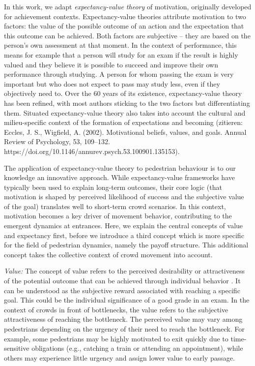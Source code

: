 \documentclass[pdflatex,sn-mathphys-num]{sn-jnl}%
\theoremstyle{thmstyleone}%
\theoremstyle{thmstyletwo}%
\theoremstyle{thmstylethree}%
\begin{document}
In this work, we adapt \textit{expectancy-value theory} \cite{atkinson_introduction_1964, vroom_work_1964, wigfield_expectancy-value_2000, eccles_expectancy_2020} of motivation, originally developed for achievement contexts. Expectancy-value theories attribute motivation to two factors: the value of the possible outcome of an action and the expectation that this outcome can be achieved. Both factors are subjective – they are based on the person's own assessment at that moment. In the context of performance, this means for example that a person will study for an exam if the result is highly valued and they believe it is possible to succeed and improve their own performance through studying. A person for whom passing the exam is very important but who does not expect to pass may study less, even if they objectively need to. Over the 60 years of its existence, expectancy-value theory has been refined, with most authors sticking to the two factors but differentiating them. Situated expectancy-value theory also takes into account the cultural and milieu-specific context of the formation of expectations and becoming (zitieren: Eccles, J. S., Wigfield, A. (2002). Motivational beliefs, values, and goals. Annual Review of Psychology, 53, 109–132. https://doi.org/10.1146/annurev.psych.53.100901.135153).

The application of expectancy-value theory to pedestrian behaviour is to our knowledge an innovative approach. While expectancy-value frameworks have typically been used to explain long-term outcomes, their core logic (that motivation is shaped by perceived likelihood of success and the subjective value of the goal) translates well to short-term crowd scenarios. In this context, motivation becomes a key driver of movement behavior, contributing to the emergent dynamics at entrances. Here, we explain the central concepts of value and expectancy first, before we introduce a third concept which is more specific for the field of pedestrian dynamics, namely the payoff structure. This additional concept takes the collective context of crowd movement into account.

\textit{Value:} The concept of value refers to the perceived desirability or attractiveness of the potential outcome that can be achieved through individual behavior \cite{vroom_work_1964, porter_managerial_1968}. It can be understood as the subjective reward associated with reaching a specific goal. This could be the individual significance of a good grade in an exam. In the context of crowds in front of bottlenecks, the value refers to the subjective attractiveness of reaching the bottleneck. The perceived value may vary among pedestrians depending on the urgency of their need to reach the bottleneck. For example, some pedestrians may be highly motivated to exit quickly due to time-sensitive obligations (e.g., catching a train or attending an appointment), while others may experience little urgency and assign lower value to early passage. 
\end{document}

